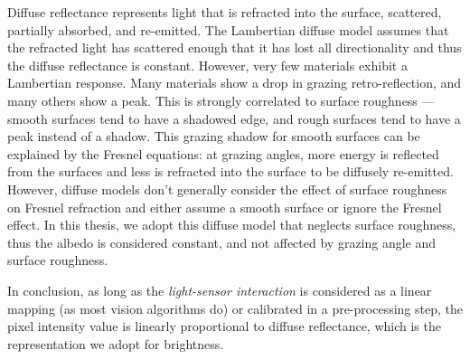 Diffuse reflectance represents light that is refracted into the surface, scattered, partially absorbed, and re-emitted. The Lambertian diffuse model assumes that the refracted light has scattered enough that it has lost all directionality and thus the diffuse reflectance is constant. However, very few materials exhibit a Lambertian response. Many materials show a drop in grazing retro-reflection, and many others show a peak. This is strongly correlated to surface roughness --- smooth surfaces tend to have a shadowed edge, and rough surfaces tend to have a peak instead of a shadow. This grazing shadow for smooth surfaces can be explained by the Fresnel equations: at grazing angles, more energy is reflected from the surfaces and less is refracted into the surface to be diffusely re-emitted. However, diffuse models don't generally consider the effect of surface roughness on Fresnel refraction and either assume a smooth surface or ignore the Fresnel effect. In this thesis, we adopt this diffuse model that neglects surface roughness, thus the albedo is considered constant, and not affected by grazing angle and surface roughness.

In conclusion, as long as the \textit{light-sensor interaction} is considered as a linear mapping (as most vision algorithms do) or calibrated in a pre-processing step, the pixel intensity value is linearly proportional to diffuse reflectance, which is the representation we adopt for brightness.


